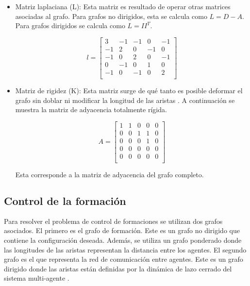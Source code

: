 \begin{itemize}
	\item Matriz laplaciana (L): Esta matriz es resultado de operar otras matrices asociadas al grafo. Para grafos no dirigidos, esta se calcula como $L = D - A$. Para grafos dirigidos se calcula como $L = I I^T$.
	
	\[
	l = 
	\left[\begin{array}{ccccc}
		3 & -1 & -1 & 0 & -1 \\
		-1 & 2 & 0 & -1 & 0 \\
		-1 & 0 & 2 & 0 & -1 \\
		0 & -1 & 0 & 1 & 0 \\
		-1 & 0 & -1 & 0 & 2 \\
	\end{array} \right]
	\]
	
	\item Matriz de rigidez (K): Esta matriz surge de qué tanto es posible deformar el grafo sin doblar ni modificar la longitud de las aristas \cite{matrices_asociadas_grafos}. A continuación se muestra la matriz de adyacencia totalmente rígida.
	
	\[
	A = 
	\left[\begin{array}{ccccc}
		1 & 1 & 0 & 0 & 0 \\
		0 & 0 & 1 & 1 & 0 \\
		0 & 0 & 0 & 1 & 0 \\
		0 & 0 & 0 & 0 & 0 \\
		0 & 0 & 0 & 0 & 0 \\
	\end{array} \right]
	\]
	
	Esta corresponde a la matriz de adyacencia del grafo completo.
		
\end{itemize}


\subsection*{Control de la formación}
Para resolver el problema de control de formaciones se utilizan dos grafos asociados. El primero es el grafo de formación. Este es un grafo no dirigido que contiene la configuración deseada. Además, se utiliza un grafo ponderado donde las longitudes de las aristas representan la distancia entre los agentes. El segundo grafo es el que representa la red de comunicación entre agentes. Este es un grafo dirigido donde las aristas están definidas por la dinámica de lazo cerrado del sistema multi-agente \cite{PenaAM_2019_tesis}. 

